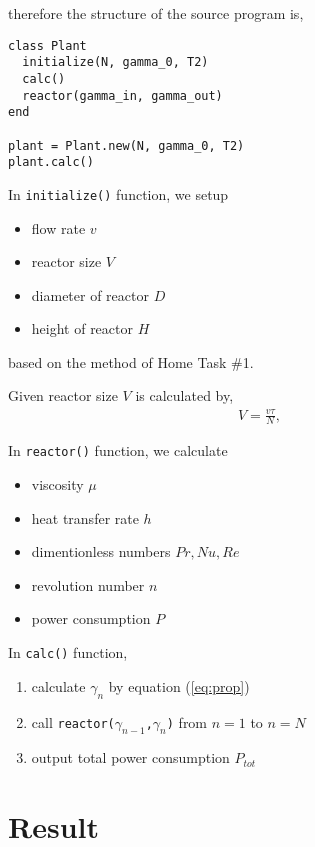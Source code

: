 \documentclass[a4paper,titlepage]{article}
\begin{document}
  therefore the structure of the source program is,
  \begin{screen}
    \begin{verbatim}
class Plant
  initialize(N, gamma_0, T2)
  calc()
  reactor(gamma_in, gamma_out)
end

plant = Plant.new(N, gamma_0, T2)
plant.calc()\end{verbatim}
  \end{screen}

  \newpage

  In \verb/initialize()/ function, we setup
  \begin{itemize}
    \item flow rate $v$
    \item reactor size $V$
    \item diameter of reactor $D$
    \item height of reactor $H$
  \end{itemize}

  based on the method of Home Task \#1.

  Given reactor size $V$ is calculated by,
  \begin{align}
    V = \frac{v\tau}{N},
  \end{align}

  In \verb/reactor()/ function, we calculate
  \begin{itemize}
    \item viscosity $\mu$
    \item heat transfer rate $h$
    \item dimentionless numbers $Pr, Nu, Re$
    \item revolution number $n$
    \item power consumption $P$
  \end{itemize}

  In \verb/calc()/ function,
  \begin{enumerate}
    \item calculate $\gamma_n$ by equation (\ref{eq:prop})
    \item call \verb/reactor(/$\gamma_{n-1}$\verb/,/$\gamma_n$\verb/)/ from $n=1$ to $n=N$
    \item output total power consumption $P_{tot}$
  \end{enumerate}

  \newpage

  \section{Result}
\end{document}
